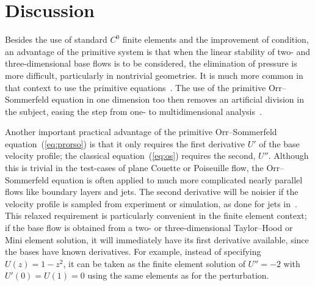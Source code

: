 \documentclass[twocolum]{afmc_art}
\begin{document}
\section{Discussion}
Besides the use of standard $C^0$ finite elements and the improvement of condition, an advantage of the primitive system is that when the linear stability of two- and three-dimensional base flows is to be considered, the elimination of pressure is more difficult, particularly in nontrivial geometries.  It is much more common in that context to use the primitive equations~\cite{barkley2002threedimensional, theofilis2003advances, bengana2019bifurcation}.  The use of the primitive Orr--Sommerfeld equation in one dimension too then removes an artificial division in the subject, easing the step from one- to multidimensional analysis~\cite{paredes2013order}.

Another important practical advantage of the primitive Orr--Sommerfeld equation~(\ref{eq:prorso}) is that it only requires the first derivative $U'$ of the base velocity profile; the classical equation~(\ref{eq:os}) requires the second, $U''$.  Although this is trivial in the test-cases of plane Couette or Poiseuille flow, the Orr--Sommerfeld equation is often applied to much more complicated nearly parallel flows like boundary layers and jets.  The second derivative will be noisier if the velocity profile is sampled from experiment or simulation, as done for jets in~\cite{varieras2007selfsustained}.  This relaxed requirement is particularly convenient in the finite element context; if the base flow is obtained from a  two- or three-dimensional Taylor--Hood or Mini element solution, it will immediately have its first derivative available, since the bases have known derivatives.  For example, instead of specifying $U (z) = 1 - z^2$, it can be taken as the finite element solution of $U'' = -2$ with $U' (0) = U(1) = 0$ using the same elements as for the perturbation.
\end{document}
